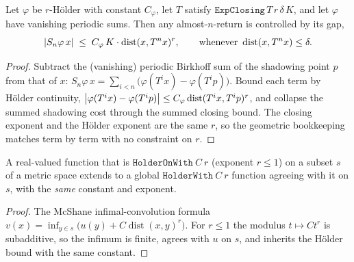 \begin{lemma}\label{lem:livsic-crux}
  \leanok
  Let \(\varphi\) be \(r\)-Hölder with constant \(C_\varphi\), let \(T\) satisfy
  \(\texttt{ExpClosing}\,T\,r\,\delta\,K\), and let \(\varphi\) have vanishing periodic sums. Then
  any almost-\(n\)-return is controlled by its gap,
  \[
    \left\lvert S_n\varphi\,x \right\rvert \;\le\; C_\varphi\,K\cdot\operatorname{dist}(x,T^n x)^{r},
    \qquad\text{whenever } \operatorname{dist}(x,T^n x)\le\delta.
  \]
\end{lemma}
\begin{proof}\leanok
  Subtract the (vanishing) periodic Birkhoff sum of the shadowing point \(p\) from that of \(x\):
  \(S_n\varphi\,x = \sum_{i<n}\bigl(\varphi(T^i x) - \varphi(T^i p)\bigr)\). Bound each term by
  Hölder continuity, \(\left\lvert \varphi(T^i x) - \varphi(T^i p) \right\rvert\le C_\varphi\operatorname{dist}(T^i x,T^i p)^{r}\),
  and collapse the summed shadowing cost through the summed closing bound. The closing exponent and
  the Hölder exponent are the same \(r\), so the geometric bookkeeping matches term by term with no
  constraint on \(r\).
\end{proof}

\begin{lemma}\label{lem:livsic-mcshane}
  \leanok
  A real-valued function that is \(\texttt{HolderOnWith}\ C\ r\) (exponent \(r\le 1\)) on a subset
  \(s\) of a metric space extends to a global \(\texttt{HolderWith}\ C\ r\) function agreeing with it
  on \(s\), with the \emph{same} constant and exponent.
\end{lemma}
\begin{proof}\leanok
  The McShane infimal-convolution formula \(v(x) = \inf_{y\in s}\bigl(u(y) + C\operatorname{dist}(x,y)^{r}\bigr)\).
  For \(r\le 1\) the modulus \(t\mapsto C t^{r}\) is subadditive, so the infimum is finite, agrees
  with \(u\) on \(s\), and inherits the Hölder bound with the same constant.
\end{proof}

